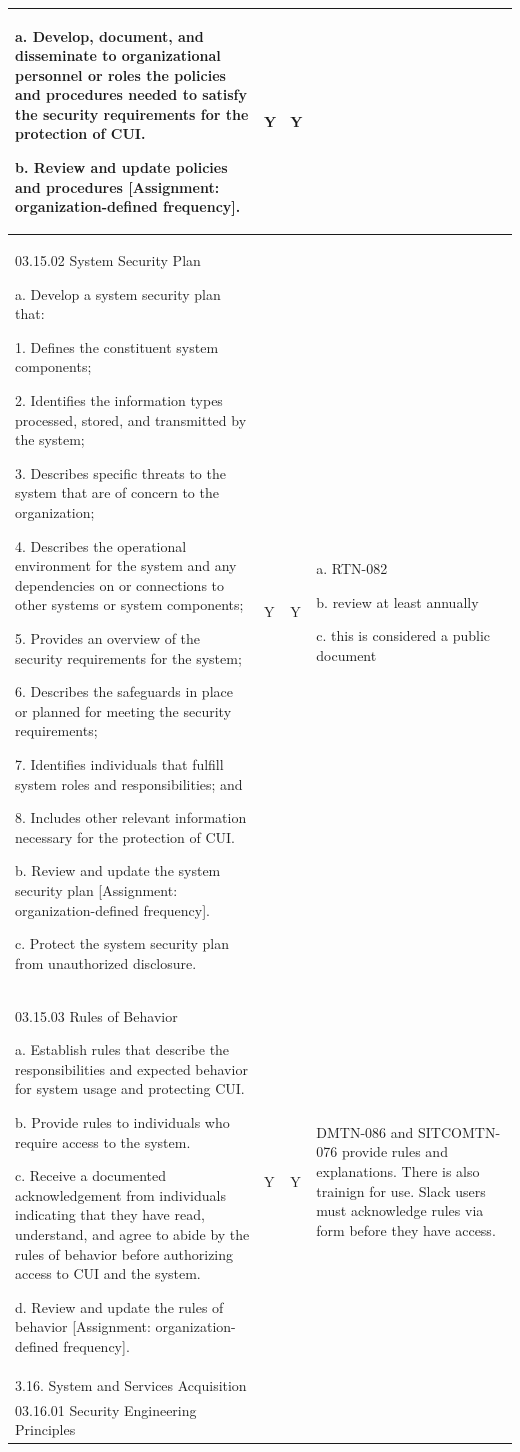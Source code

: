 \begin{longtable} {|p{}|p{}|p{}|p{} |}
{a. Develop, document, and disseminate to organizational personnel or roles the policies and procedures needed to satisfy the security requirements for the protection of CUI.

b. Review and update policies and procedures [Assignment: organization-defined frequency].}&{Y}&{Y}& \\ \hline
{03.15.02 System Security Plan

a. Develop a system security plan that:

1. Defines the constituent system components;

2. Identifies the information types processed, stored, and transmitted by the system;

3. Describes specific threats to the system that are of concern to the organization;

4. Describes the operational environment for the system and any dependencies on or connections to other systems or system components;

5. Provides an overview of the security requirements for the system;

6. Describes the safeguards in place or planned for meeting the security requirements;

7. Identifies individuals that fulfill system roles and responsibilities; and

8. Includes other relevant information necessary for the protection of CUI.

b. Review and update the system security plan [Assignment: organization-defined frequency].

c. Protect the system security plan from unauthorized disclosure.}&{Y}&{Y}&{a. RTN-082

b. review at least annually

c. this is considered a public document} \\ \hline
{03.15.03 Rules of Behavior

a. Establish rules that describe the responsibilities and expected behavior for system usage and protecting CUI.

b. Provide rules to individuals who require access to the system.

c. Receive a documented acknowledgement from individuals indicating that they have read, understand, and agree to abide by the rules of behavior before authorizing access to CUI and the system.

d. Review and update the rules of behavior [Assignment: organization-defined frequency].}&{Y}&{Y}&{DMTN-086 and SITCOMTN-076 provide rules and explanations.
There is also trainign for use.
Slack  users  must acknowledge rules via form before they have access. } \\ \hline
{3.16. System and Services Acquisition}&&& \\ \hline
{03.16.01 Security Engineering Principles

}
\end{longtable}
